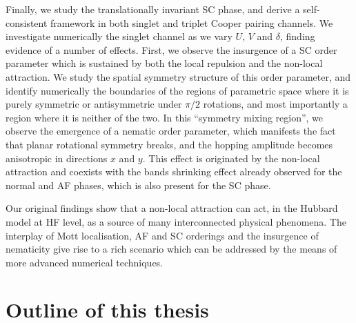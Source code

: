 Finally, we study the translationally invariant SC phase, and derive a self-consistent framework in both singlet and triplet Cooper pairing channels. We investigate numerically the singlet channel as we vary $U$, $V$ and $\delta$, finding evidence of a number of effects. First, we observe the insurgence of a SC order parameter which is sustained by both the local repulsion and the non-local attraction. We study the spatial symmetry structure of this order parameter, and identify numerically the boundaries of the regions of parametric space where it is purely symmetric or antisymmetric under $\pi/2$ rotations, and most importantly a region where it is neither of the two. In this ``symmetry mixing region'', we observe the emergence of a nematic order parameter, which manifests the fact that planar rotational symmetry breaks, and the hopping amplitude becomes anisotropic in directions $x$ and $y$. This effect is originated by the non-local attraction and coexists with the bands shrinking effect already observed for the normal and AF phases, which is also present for the SC phase.

Our original findings show that a non-local attraction can act, in the Hubbard model at HF level, as a source of many interconnected physical phenomena. The interplay of Mott localisation, AF and SC orderings and the insurgence of nematicity give rise to a rich scenario which can be addressed by the means of more advanced numerical techniques.

\section{Outline of this thesis}\label{subsec:outline}

